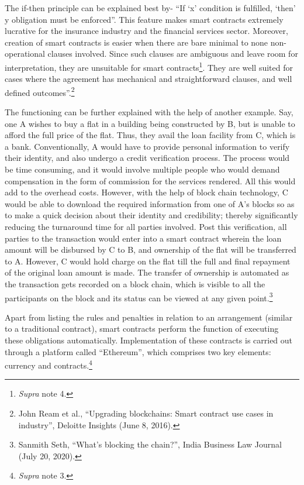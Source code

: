 \begin{multicols}{2}
\noi
The if-then principle can be explained best by- “If ‘x’ condition is fulfilled, ‘then’ y
obligation must be enforced”. This feature makes smart contracts extremely lucrative for the
insurance industry and the financial services sector. Moreover, creation of smart contracts is
easier when there are bare minimal to none non-operational clauses involved. Since such
clauses are ambiguous and leave room for interpretation, they are unsuitable for smart contracts\footnote{\textit{Supra} note 4.}. They are well suited for cases where the agreement has mechanical and
straightforward clauses, and well defined outcomes”.\footnote{John Ream et al., “Upgrading blockchains: Smart contract use cases in industry”, Deloitte Insights (June 8,
2016).}

\vspace{-.05cm}

\noi
The functioning can be further explained with the help of another example. Say, one A
wishes to buy a flat in a building being constructed by B, but is unable to afford the full price
of the flat. Thus, they avail the loan facility from C, which is a bank. Conventionally, A
would have to provide personal information to verify their identity, and also undergo a credit
verification process. The process would be time consuming, and it would involve multiple
people who would demand compensation in the form of commission for the services
rendered. All this would add to the overhead costs. However, with the help of block chain
technology, C would be able to download the required information from one of A’s blocks so
as to make a quick decision about their identity and credibility; thereby significantly reducing
the turnaround time for all parties involved. Post this verification, all parties to the transaction
would enter into a smart contract wherein the loan amount will be disbursed by C to B, and
ownership of the flat will be transferred to A. However, C would hold charge on the flat till
the full and final repayment of the original loan amount is made. The transfer of ownership is
automated as the transaction gets recorded on a block chain, which is visible to all the
participants on the block and its status can be viewed at any given point.\footnote{Sanmith Seth, “What’s blocking the chain?”, India Business Law Journal (July 20, 2020).}

\vspace{-.05cm}

\noi
Apart from listing the rules and penalties in relation to an arrangement (similar to a
traditional contract), smart contracts perform the function of executing these obligations
automatically. Implementation of these contracts is carried out through a platform called
“Ethereum”, which comprises two key elements: currency and contracts.\footnote{\textit{Supra} note 3.}


\end{multicols}
